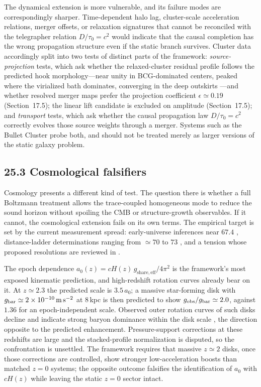 \documentclass[11pt]{article}
\begin{document}
The dynamical extension is more vulnerable, and its failure modes are correspondingly sharper. Time-dependent halo lag, cluster-scale acceleration relations, merger offsets, or relaxation signatures that cannot be reconciled with the telegrapher relation $D/\tau_0=c^2$ would indicate that the causal completion has the wrong propagation structure even if the static branch survives. Cluster data accordingly split into two tests of distinct parts of the framework: \emph{source-projection} tests, which ask whether the relaxed-cluster residual profile follows the predicted hook morphology---near unity in BCG-dominated centers, peaked where the virialized bath dominates, converging in the deep outskirts \citep{Tian2020,Eckert2022,Li2023}---and whether resolved merger maps prefer the projection coefficient $\epsilon\simeq0.19$ (Section~17.5); the linear lift candidate is excluded on amplitude (Section~17.5); and \emph{transport} tests, which ask whether the causal propagation law $D/\tau_0=c^2$ correctly evolves those source weights through a merger. Systems such as the Bullet Cluster \citep{Clowe2006} probe both, and should not be treated merely as larger versions of the static galaxy problem.

\subsection{25.3 Cosmological falsifiers}

Cosmology presents a different kind of test. The question there is whether a full Boltzmann treatment allows the trace-coupled homogeneous mode to reduce the sound horizon without spoiling the CMB or structure-growth observables. If it cannot, the cosmological extension fails on its own terms. The empirical target is set by the current measurement spread: early-universe inferences near $67.4$ \citep{Planck2020}, distance-ladder determinations ranging from $\simeq70$ \citep{Freedman2025} to $73$ \citep{Riess2022}, and a tension whose proposed resolutions are reviewed in \citet{DiValentino2021}.

The epoch dependence $a_0(z)=cH(z)\,g_{\mathrm{share,eff}}/4\pi^2$ is the framework's most exposed kinematic prediction, and high-redshift rotation curves already bear on it. At $z\simeq2.3$ the predicted scale is $3.5\,a_0$; a massive star-forming disk with $g_{\rm bar}\simeq2\times10^{-10}\,{\rm m\,s^{-2}}$ at $8\,$kpc is then predicted to show $g_{\rm obs}/g_{\rm bar}\simeq2.0$, against $1.36$ for an epoch-independent scale. Observed outer rotation curves of such disks decline and indicate strong baryon dominance within the disk scale \citep{Genzel2017,Lang2017}, the direction opposite to the predicted enhancement. Pressure-support corrections at these redshifts are large and the stacked-profile normalization is disputed, so the confrontation is unsettled. The framework requires that massive $z\simeq2$ disks, once those corrections are controlled, show stronger low-acceleration boosts than matched $z=0$ systems; the opposite outcome falsifies the identification of $a_0$ with $cH(z)$ while leaving the static $z=0$ sector intact.
\end{document}
